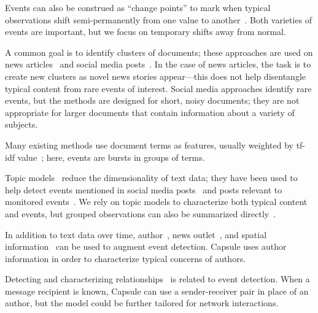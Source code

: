 Events can also be construed as ``change points'' to mark when typical observations shift semi-permanently from one value to another~\cite{guralnik1999event,adams2007bayesian}. Both varieties of events are important, but we focus on temporary shifts away from normal.

A common goal is to identify clusters of documents; these approaches are used on news articles~\cite{zhao2012novel,zhao2007temporal,zhang2002novelty,li2005probabilistic,wang2007mining,allan1998line} and social media posts~\cite{VanDam:2012,lau2012line,jackoway2011identification,sakaki2010earthquake,reuter2012event,becker2010learning,sayyadi2009event}.  
In the case of news articles, the task is to create new clusters as novel news stories appear---this does not help disentangle typical content from rare events of interest.
Social media approaches identify rare events, but the methods are designed for short, noisy documents; they are not appropriate for larger documents that contain information about a variety of subjects.

Many existing methods use document terms as features, usually weighted by tf-idf value~\cite{fung2005parameter,kumaran2004text,brants2003system,das2011dynamic,zhao2007temporal,zhao2012novel}; here, events are bursts in groups of terms. %

Topic models~\cite{Blei:2012} reduce the dimensionality of text data; they have been used to help detect events mentioned in social media posts~\cite{lau2012line,dou2012leadline} and posts relevant to monitored events~\cite{VanDam:2012}.
We rely on topic models to characterize both typical content and events, but grouped observations can also be summarized directly~\cite{peng2007event,chakrabarti2011event,gao2012joint}.

In addition to text data over time, author~\cite{zhao2007temporal}, news outlet~\cite{wang2007mining}, and spatial information~\cite{Neill:2005,mathioudakis2010identifying,liu2011using} can be used to augment event detection.  Capsule uses author information in order to characterize typical concerns of authors.

Detecting and characterizing relationships~\cite{schein2015bayesian,linderman2014discovering,das2011dynamic} is related to event detection.  When a message recipient is known, Capsule can use a sender-receiver pair in place of an author, but the model could be further tailored for network interactions.

